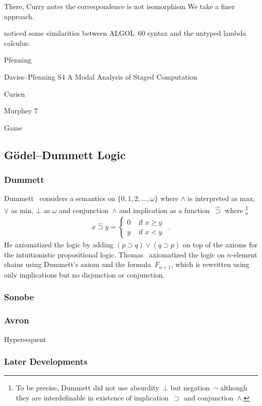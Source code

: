 There, Curry notes the correspondence is not isomorphism  We take a finer approach.

\citet{landin1965} noticed some similarities between ALGOL~60 syntax and
the untyped lambda calculus.

Pfenning

Davies--Pfenning S4 A Modal Analysis of Staged Computation

Curien

Murphey 7

Game


\subsection{G\"odel--Dummett Logic}

\subsubsection{Dummett}
Dummett~\cite{dummett59} considers a semantics on $\{0,1,2,\ldots,\omega\}$ where
$\wedge$ is interpreted as max, $\vee$ as min, $\bot$ as $\omega$
and conjunction~$\wedge$
 and implication as a
function~$\hat\supset$ where%
\footnote{To be precise, Dummett did not use absurdity~$\bot$ but negation~$\neg$
although they are interdefinable in existence of implication~$\supset$
and conjunction~$\wedge$.}
\begin{align*}
 x \hat\supset y= \begin{cases}
		    0 &\text{ if } x\ge y \\
		    y &\text{ if } x < y
		  \end{cases}\enspace.
\end{align*}
He axiomatized the logic by adding $(p\supset q)\lor(q\supset p)$ on top
of the axioms for the intuitionistic propositional logic.
Thomas~\citep{thomas1962} axiomatized
 the logic on $n$-element chains using Dummett's axiom and the
 formula~$F_{n+1}$,
 which is rewritten using only implications but no disjunction or conjunction.

\subsubsection{Sonobe}

\subsubsection{Avron}
Hypersequent


\subsubsection{Later Developments}

